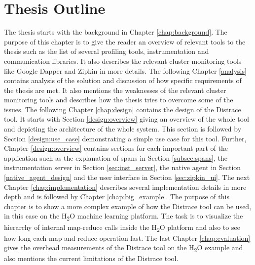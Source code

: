 \section{Thesis Outline}
The thesis starts with the background in Chapter \ref{chap:background}. The purpose of this chapter is to give the reader an overview of relevant tools to the thesis such as the list of several profiling tools, instrumentation and communication libraries. It also describes the relevant cluster monitoring tools like Google Dapper and Zipkin in more details. The following Chapter \ref{analysis} contains analysis of the solution and discussion of how specific requirements of the thesis are met. It also mentions the weaknesses of the relevant cluster monitoring tools and describes how the thesis tries to overcome some of the issues. The following Chapter \ref{chap:design} contains the design of the Distrace tool. It starts with Section \ref{design:overview} giving an overview of the whole tool and depicting the architecture of the whole system. This section is followed by Section \ref{design:use_case} demonstrating a simple use case for this tool. Further, Chapter \ref{design:overview} contains sections for each important part of the application such as the explanation of spans in Section \ref{subsec:spans}, the instrumentation server in Section \ref{sec:inst_server}, the native agent in Section \ref{native_agent_design} and the user interface in Section \ref{sec:zipkin_ui}. The next Chapter \ref{chap:implementation} describes several implementation details in more depth and is followed by Chapter \ref{chap:big_example}. The purpose of this chapter is to show a more complex example of how the Distrace tool can be used, in this case on the H\textsubscript{2}O machine learning platform. The task is to visualize the hierarchy of internal map-reduce calls inside the H\textsubscript{2}O platform and also to see how long each map and reduce operation last. The last Chapter \ref{chap:evaluation} gives the overhead measurements of the Distrace tool on the H\textsubscript{2}O example and also mentions the current limitations of the Distrace tool. 
